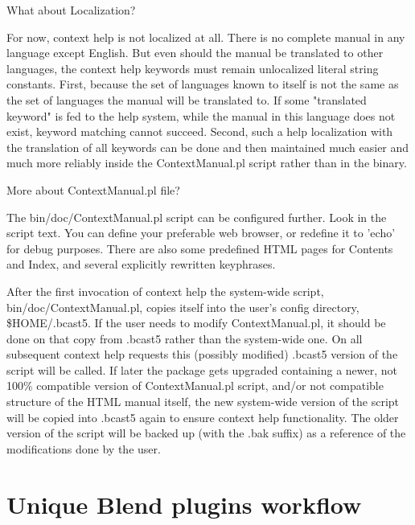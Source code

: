 What about Localization?

For now, \CGG{} context help is not localized at all. There is no complete \CGG{} manual in any language except English. But even should the manual be translated to other languages, the context help keywords must remain unlocalized literal string constants. First, because the set of languages known to \CGG{} itself is not the same as the set of languages the manual will be translated to. If some "translated keyword" is fed to the help system, while the manual in this language does not exist, keyword matching cannot succeed. Second, such a help localization with the translation of all keywords can be done and then maintained much easier and much more reliably inside the ContextManual.pl script rather than in the \CGG{} binary.

More about ContextManual.pl file?

The bin/doc/ContextManual.pl script can be configured further. Look in the script text. You can define your preferable web browser, or redefine it to 'echo' for debug purposes. There are also some predefined HTML pages for Contents and Index, and several explicitly rewritten keyphrases. 

After the first invocation of context help the system-wide script, bin/doc/ContextManual.pl, copies itself into
the user's config directory, \$HOME/.bcast5. If the user needs to modify ContextManual.pl, it should be done
on that copy from .bcast5 rather than the system-wide one. On all subsequent context help requests this
(possibly modified) .bcast5 version of the script will be called.  If later the \CGG{} package gets
upgraded containing a newer, not 100\% compatible version of ContextManual.pl script, and/or not compatible
structure of the HTML manual itself, the new system-wide version of the script will be copied into .bcast5
again to ensure context help functionality. The older version of the script will be backed up (with the .bak
suffix) as a reference of the modifications done by the user.

\section{Unique Blend plugins workflow}
\label{sec:ba_bp_workflow}

